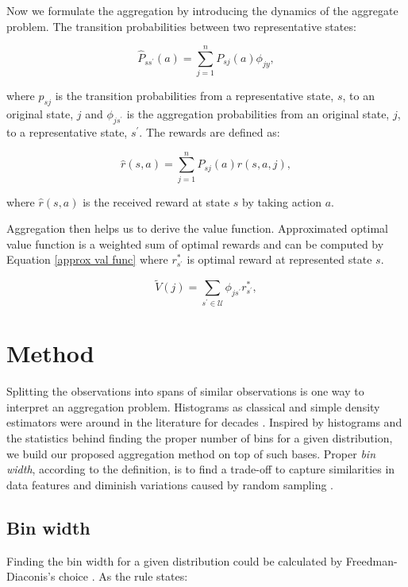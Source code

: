 \documentclass{article}
\begin{document}
    Now we formulate the aggregation by introducing the dynamics of the aggregate problem.
    The transition probabilities between two representative states:

    \begin{equation}
        \hat{P}_{s s^\prime}(a)=\sum_{j=1}^{n} P_{s j}(a) \phi_{j y},
    \end{equation}

    where $p_ {s j}$ is the transition probabilities from a representative state, $s$, to an original state, $j$
    and $\phi_{j s^\prime}$ is the aggregation probabilities from an original state, $j$, to a representative state,
    $s^\prime$.
    The rewards are defined as:

    \begin{equation}
        \hat{r}(s, a)=\sum_{j=1}^{n} P_{s j}(a) r(s, a, j),
    \end{equation}

    where $\hat{r}(s, a)$ is the received reward at state $s$ by taking action $a$.


    Aggregation then helps us to derive the value function.
    Approximated optimal value function is a weighted sum of optimal rewards and can be computed by
    Equation \ref{approx val func} where $r_{s^\prime}^{\ast}$ is optimal reward at represented state $s$.

    \begin{equation}
        \label{approx val func}
        \tilde{V}(j)=\sum_{s^\prime \in \mathcal{U}} \phi_{j s^\prime} r_{s^\prime}^{\ast},
    \end{equation}


\section{Method}
\label{sec:method}
    Splitting the observations into spans of similar observations is one way to interpret an aggregation
    problem.
    Histograms as classical and simple density estimators were around in the literature for decades \cite{Scott1979,
    Scott2015}.
    Inspired by histograms and the statistics behind finding the proper number of bins for a given distribution, we
    build our proposed aggregation method on top of such bases.
    Proper \textit{bin width}, according to the definition, is to find a trade-off to capture similarities in data
    features and diminish variations caused by random sampling \cite{Knuth2019}.

    \subsection{Bin width}
    Finding the bin width for a given distribution could be calculated by Freedman-Diaconis's choice
    \cite{Freedman1981}.
    As the rule states:
\end{document}
